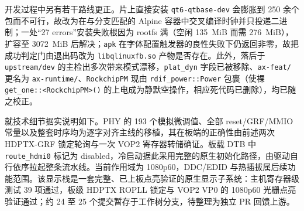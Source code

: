 开发过程中另有若干路线更正。片上直接安装 \texttt{qt6-qtbase-dev} 会膨胀到 250 余个包而不可行，故改为在与分支匹配的 Alpine 容器中交叉编译时钟并只投递二进制；一处“27 errors”安装失败根因为 rootfs 满（空闲 135~MiB 而需 276~MiB），扩容至 3072~MiB 后解决；\texttt{apk} 在字体配置触发器的良性失败下仍返回非零，故把成功判定门由退出码改为 \texttt{libqlinuxfb.so} 产物是否存在。此外，落后于 \texttt{upstream/dev} 的主检出多次带来模式漂移，\texttt{plat\_dyn} 字段已被移除、\texttt{ax-feat/} 更名为 \texttt{ax-runtime/}、\texttt{RockchipPM} 现由 \texttt{rdif\_power::Power} 包裹（使裸 \texttt{get\_one::<RockchipPM>()} 的上电成为静默空操作，相应死代码已删除），均已随之校正。

就技术细节据实说明如下。PHY 的 193 个模拟微调值、全部 reset/GRF/MMIO 常量以及整套时序均为逐字对齐主线的移植，其在板端的正确性由前述两次 HDPTX-GRF 锁定轮询与一次 VOP2 寄存器转储确证。板载 DTB 中 \texttt{route\_hdmi0} 标记为 disabled，冷启动据此采用完整的原生初始化路径，由驱动自行依序拉起整条流水线。当前作用域为 1080p60，DDC/EDID 与热插拔属后续功能范围。该显示栈是一套完整、已上板点亮验证的原生显示子系统：主机寄存器级测试 39 项通过，板级 HDPTX ROPLL 锁定与 VOP2 VP0 的 1080p60 光栅点亮验证通过；约 24 至 25 个提交暂存于工作树分支，待整理为独立 PR 回馈上游。
